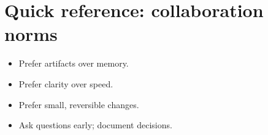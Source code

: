 \section{Quick reference: collaboration norms}
\begin{itemize}
\item Prefer artifacts over memory.
\item Prefer clarity over speed.
\item Prefer small, reversible changes.
\item Ask questions early; document decisions.
\end{itemize}
